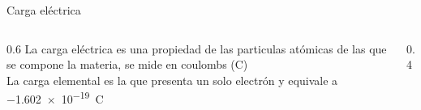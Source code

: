\documentclass[aspectratio=169]{beamer}
\begin{document}
\begin{frame}{Carga eléctrica} 
    \begin{columns}[onlytextwidth]
    \begin{column}{0.6\textwidth}
        La carga eléctrica es una propiedad de las particulas atómicas de las que se compone la materia, se mide en coulombs (\si{\coulomb})\\[4pt]
        La carga elemental es la que presenta un solo electrón y equivale a \SI{-1.602e-19}{C}
    \end{column}
    \begin{column}{0.4\textwidth}
        \begin{center}
        \end{center}
    \end{column}
    \end{columns}
\end{frame}
\end{document}
